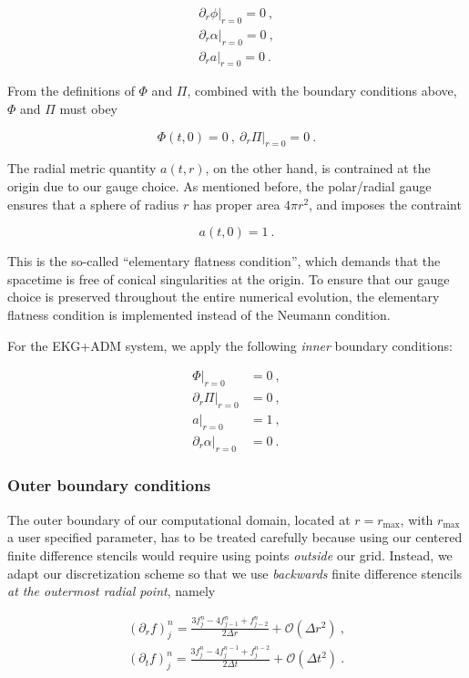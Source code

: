 \documentclass[a4paper,11pt]{article}
\renewcommand{\a}{\alpha}
\newcommand{\pd}{\partial}
\newcommand{\nn}{\nonumber}
\newcommand{\dt}{\Delta t}
\newcommand{\dr}{\Delta r}
\newcommand{\order}[2]{\mathcal{O}\lrpar{#1^{#2}}}
\newcommand{\lrpar}[1]{\left( #1 \right)}
\newcommand{\n}{\noindent}
\newcommand{\eq}[1]{
  \begin{equation}
    #1
  \end{equation}
}
\newcommand{\spl}[1]{
  \begin{split}
    #1
  \end{split}
}
\newcommand{\al}[1]{
  \begin{align}
    #1
  \end{align}
}
\renewcommand{\parbox}[2]{

  \vspace*{0.25in}
  
  \begin{tcolorbox}[title=Box #1,colback=blue!5!white,colframe=gray!75!black]
    #2
  \end{tcolorbox}

  \vspace*{0.25in}

}
\begin{document}
\al{
  \left.\pd_{r}\phi\right|_{r=0} = 0\ ,\\
  \left.\pd_{r}\a\right|_{r=0} = 0\ ,\\
  \left.\pd_{r}a\right|_{r=0} = 0\ .
}

\n From the definitions of $\Phi$ and $\Pi$, combined with the boundary conditions above, $\Phi$ and $\Pi$ must obey

\eq{
  \Phi(t,0) = 0\ ,\ \left.\pd_{r}\Pi\right|_{r=0} = 0\ .
}

The radial metric quantity $a(t,r)$, on the other hand, is contrained at the origin due to our gauge choice. As mentioned before, the polar/radial gauge ensures that a sphere of radius $r$ has proper area $4\pi r^{2}$, and imposes the contraint

\eq{ a(t,0) = 1\ . }

\n This is the so-called ``elementary flatness condition'', which demands that the spacetime is free of conical singularities at the origin. To ensure that our gauge choice is preserved throughout the entire numerical evolution, the elementary flatness condition is implemented instead of the Neumann condition.

\parbox{4: EKG+ADM -- Inner boundary conditions}{
  For the EKG+ADM system, we apply the following \emph{inner} boundary conditions:
  \al{
    \left.\Phi\right|_{r=0} &= 0\ ,\nn\\
    \left.\pd_{r}\Pi\right|_{r=0} &= 0\ ,\nn\\
    \left.a\right|_{r=0} &= 1\ ,\nn\\
    \left.\pd_{r}\a\right|_{r=0} &= 0\ .\nn
  }
}

\subsubsection{Outer boundary conditions}

The outer boundary of our computational domain, located at $r=r_{\max}$, with $r_{\max}$ a user specified parameter, has to be treated carefully because using our centered finite difference stencils would require using points \emph{outside} our grid. Instead, we adapt our discretization scheme so that we use \emph{backwards} finite difference stencils \emph{at the outermost radial point}, namely

\eq{
  \spl{
    \lrpar{\partial_{r}f}^{n}_{j} = \frac{3f^{n}_{j} - 4f^{n}_{j-1} + f^{n}_{j-2}}{2\dr} + \order{\dr}{2}\ ,\\
    \lrpar{\partial_{t}f}^{n}_{j} = \frac{3f^{n}_{j} - 4f^{n-1}_{j} + f^{n-2}_{j}}{2\dt} + \order{\dt}{2}\ .
  }
}
\end{document}

